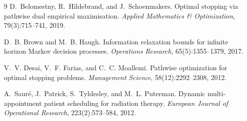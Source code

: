 \documentclass[11pt]{article}
\theoremstyle{definition}
\begin{document}
\begin{thebibliography}{9}
D.~Belomestny, R.~Hildebrand, and J.~Schoenmakers.
Optimal stopping via pathwise dual empirical maximisation.
\newblock \emph{Applied Mathematics \& Optimization}, 79(3):715--741, 2019.

D.~B. Brown and M.~B. Haugh.
Information relaxation bounds for infinite horizon Markov decision processes.
\newblock \emph{Operations Research}, 65(5):1355--1379, 2017.

V.~V. Desai, V.~F. Farias, and C.~C. Moallemi.
Pathwise optimization for optimal stopping problems.
\newblock \emph{Management Science}, 58(12):2292--2308, 2012.

A.~Saur\'e, J.~Patrick, S.~Tyldesley, and M.~L. Puterman.
Dynamic multi-appointment patient scheduling for radiation therapy.
\newblock \emph{European Journal of Operational Research}, 223(2):573--584, 2012.
\end{thebibliography}
\end{document}
